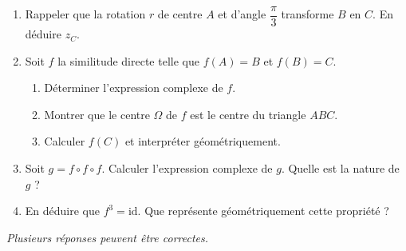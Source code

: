 \begin{enumerate}
	\item Rappeler que la rotation $r$ de centre $A$ et d'angle $\dfrac{\pi}{3}$
	transforme $B$ en $C$. En déduire $z_C$.

	\item Soit $f$ la similitude directe telle que $f(A) = B$ et $f(B) = C$.
	\begin{enumerate}
		\item Déterminer l'expression complexe de $f$.
		\item Montrer que le centre $\Omega$ de $f$ est le centre du triangle $ABC$.
		\item Calculer $f(C)$ et interpréter géométriquement.
	\end{enumerate}

	\item Soit $g = f \circ f \circ f$. Calculer l'expression complexe de $g$.
	Quelle est la nature de $g$ ?

	\item En déduire que $f^3 = \mathrm{id}$. Que représente géométriquement
	cette propriété ?
\end{enumerate}



\textit{Plusieurs réponses peuvent être correctes.}

